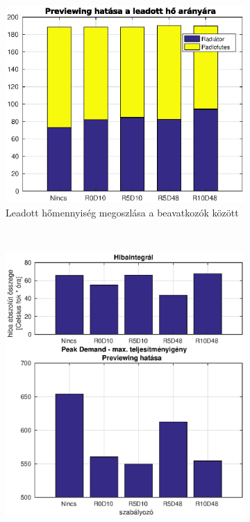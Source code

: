 \documentclass[14pt,handout]{beamer}
\begin{document}
\begin{frame}
\begin{figure}[H]
	\begin{subfigure}[t]{0.47\textwidth}
		\centering
		\includegraphics[trim=0 -40 0 0, clip,width=1.1\textwidth]{figures/onlab/compare/A_compareEnergy}
		\caption{Leadott hőmennyiség megoszlása a beavatkozók között}
		\label{fig:constrefHeat}
	\end{subfigure}
	~
	\begin{subfigure}[t]{0.47\textwidth}
		\centering
		\includegraphics[trim=0 0 0 0, clip,width=1.1\textwidth]{figures/onlab/compare/A_compareComfort}

\end{subfigure}
\end{figure}
\end{frame}
\end{document}
